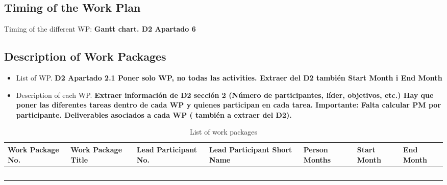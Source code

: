 \subsection{Timing of the Work Plan}

Timing of the different WP: \textbf{Gantt chart. D2 Apartado 6}

\subsection{Description of Work Packages}

\begin{itemize}

\item List of WP. \textbf{D2 Apartado 2.1 Poner solo WP, no todas las activities. Extraer del D2 también Start Month i End Month}

\item Description of each WP. \textbf{Extraer información de D2 sección 2 (Número de participantes, líder, objetivos, etc.) Hay que poner las diferentes tareas dentro de cada WP y quienes participan en cada tarea. Importante: Falta calcular PM por participante. Deliverables asociados a cada WP ( también a extraer del D2).}

\end{itemize}

\begin{longtable}[H]{p{1.3cm} p{2cm} p{1.8cm} p{2cm} p{1.9cm} p{1.6cm} p{1.4cm}}
	\toprule[2pt]
	
	\textbf{Work Package No.} & \textbf{Work Package Title} & \textbf{Lead Participant No.} & \textbf{Lead Participant Short Name} & \textbf{Person Months} & \textbf{Start Month} & \textbf{End Month} \\
	
	\midrule[1.5pt] 
	\endhead
	
	 &  &  &  &  &  & \vspace{0.2cm} \\
	
	\midrule

	 &  &  &  &  &  & \vspace{0.2cm} \\
	
	\midrule
	
	 &  &  &  &  &  &  \vspace{0.2cm} \\

	\midrule

 	 &  &  &  &  &  &  \vspace{0.2cm} \\
	
	\bottomrule[2pt]
	
	\caption{List of work packages}
	\label{workpackages}
\end{longtable}


